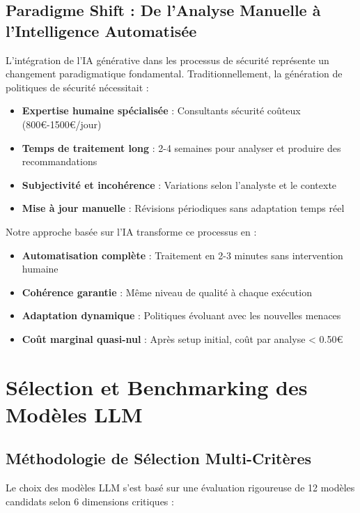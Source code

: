 \documentclass[12pt,a4paper]{report}
\begin{document}
\subsection{Paradigme Shift : De l'Analyse Manuelle à l'Intelligence Automatisée}

L'intégration de l'IA générative dans les processus de sécurité représente un changement paradigmatique fondamental. Traditionnellement, la génération de politiques de sécurité nécessitait :

\begin{itemize}
    \item \textbf{Expertise humaine spécialisée} : Consultants sécurité coûteux (800€-1500€/jour)
    \item \textbf{Temps de traitement long} : 2-4 semaines pour analyser et produire des recommandations
    \item \textbf{Subjectivité et incohérence} : Variations selon l'analyste et le contexte
    \item \textbf{Mise à jour manuelle} : Révisions périodiques sans adaptation temps réel
\end{itemize}

Notre approche basée sur l'IA transforme ce processus en :
\begin{itemize}
    \item \textbf{Automatisation complète} : Traitement en 2-3 minutes sans intervention humaine
    \item \textbf{Cohérence garantie} : Même niveau de qualité à chaque exécution
    \item \textbf{Adaptation dynamique} : Politiques évoluant avec les nouvelles menaces
    \item \textbf{Coût marginal quasi-nul} : Après setup initial, coût par analyse < 0.50€
\end{itemize}

\section{Sélection et Benchmarking des Modèles LLM}

\subsection{Méthodologie de Sélection Multi-Critères}

Le choix des modèles LLM s'est basé sur une évaluation rigoureuse de 12 modèles candidats selon 6 dimensions critiques :
\end{document}
